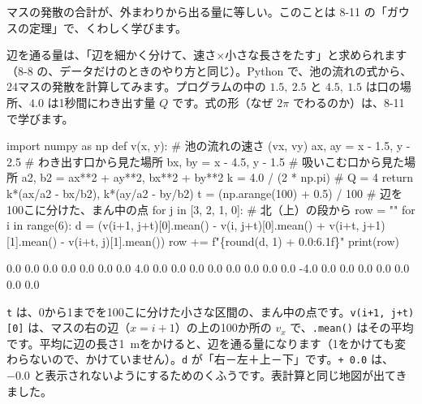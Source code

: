 マスの発散の合計が、外まわりから出る量に等しい。このことは 8-11 の「ガウスの定理」で、くわしく学びます。

辺を通る量は、「辺を細かく分けて、速さ×小さな長さをたす」と求められます（8-8 の、データだけのときのやり方と同じ）。Python で、池の流れの式から、24マスの発散を計算してみます。プログラムの中の $1.5,\ 2.5$ と $4.5,\ 1.5$ は口の場所、$4.0$ は1秒間にわき出す量 $Q$ です。式の形（なぜ $2\pi$ でわるのか）は、8-11 で学びます。

\begin{bkcode}[Python]
import numpy as np
def v(x, y):    \# 池の流れの速さ (vx, vy)
    ax, ay = x - 1.5, y - 2.5    \# わき出す口から見た場所
    bx, by = x - 4.5, y - 1.5    \# 吸いこむ口から見た場所
    a2, b2 = ax**2 + ay**2, bx**2 + by**2
    k = 4.0 / (2 * np.pi)        \# Q = 4
    return k*(ax/a2 - bx/b2), k*(ay/a2 - by/b2)
t = (np.arange(100) + 0.5) / 100    \# 辺を100こに分けた、まん中の点
for j in [3, 2, 1, 0]:              \# 北（上）の段から
    row = ""
    for i in range(6):
        d = (v(i+1, j+t)[0].mean() - v(i, j+t)[0].mean()
             + v(i+t, j+1)[1].mean() - v(i+t, j)[1].mean())
        row += f"\{round(d, 1) + 0.0:6.1f\}"
    print(row)
\end{bkcode}
\begin{bkcodeout}[実行結果]
   0.0   0.0   0.0   0.0   0.0   0.0
   0.0   4.0   0.0   0.0   0.0   0.0
   0.0   0.0   0.0   0.0  -4.0   0.0
   0.0   0.0   0.0   0.0   0.0   0.0
\end{bkcodeout}
\vspace{4pt}
\noindent \texttt{t} は、0から1までを100こに分けた小さな区間の、まん中の点です。\texttt{v(i+1, j+t)[0]} は、マスの右の辺（$x=i+1$）の上の100か所の $v_x$ で、\texttt{.mean()} はその平均です。平均に辺の長さ\qty{1}{m}をかけると、辺を通る量になります（1をかけても変わらないので、かけていません）。\texttt{d} が「右－左＋上－下」です。\texttt{+ 0.0} は、$-0.0$ と表示されないようにするためのくふうです。表計算と同じ地図が出てきました。





